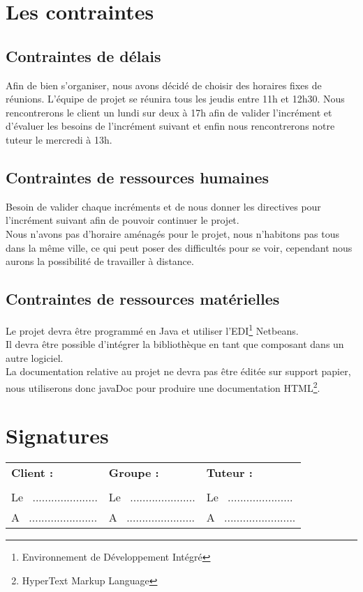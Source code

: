 \documentclass[12pt,a4paper,openany]{article}
\begin{document}
	\section{Les contraintes}
	\subsection{Contraintes de délais}
	Afin de bien s'organiser, nous avons décidé de choisir des horaires fixes de réunions. L'équipe de projet se réunira tous
	les jeudis entre 11h et 12h30. Nous rencontrerons le client un lundi sur deux à 17h afin de valider l'incrément et d'évaluer les
	besoins de l'incrément suivant et enfin nous rencontrerons notre 
	tuteur le mercredi à 13h.\\

	\subsection{Contraintes de ressources humaines}
	Besoin de valider chaque incréments et de nous donner les directives pour l'incrément suivant afin de pouvoir continuer le projet. \\
	Nous n'avons pas d'horaire aménagés pour le projet, nous n'habitons pas tous dans la même ville, ce qui peut poser des difficultés pour se voir, cependant
	nous aurons la possibilité de travailler à distance. 
	\subsection{Contraintes de ressources matérielles}
	Le projet devra être programmé en Java et utiliser l'EDI\footnote{Environnement de Développement Intégré} Netbeans. \\
	Il devra être possible d'intégrer la bibliothèque en tant que composant dans un autre logiciel. \\
	La documentation relative au projet ne devra pas être éditée sur support papier, nous utiliserons donc javaDoc pour produire une documentation 
	HTML\footnote{HyperText Markup Language}.  
	

\section*{Signatures}
\vspace{20px}
\begin{tabular}[center]{p{175px}p{175px}p{175px}}
  \textbf{Client :} & \textbf{Groupe :} & \textbf{Tuteur :} \\
  \\
  Le ~..................... & Le ~..................... & Le ~..................... \\
  A ~...................... & A ~...................... & A ~....................... \\
\end{tabular}
\end{document}
